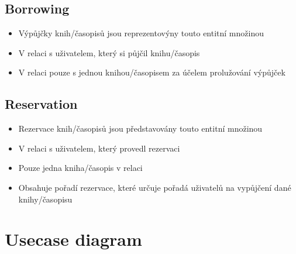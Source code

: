 \documentclass{article}
\begin{document}
\subsection*{Borrowing}
\begin{itemize}
    \item Výpůjčky knih/časopisů jsou reprezentovýny touto entitní množinou
    \item V relaci s uživatelem, který si půjčil knihu/časopis
    \item V relaci pouze s jednou knihou/časopisem za účelem prolužování
    výpůjček
\end{itemize}

\subsection*{Reservation}
\begin{itemize}
    \item Rezervace knih/časopisů jsou představovány touto entitní množinou
    \item V relaci s uživatelem, který provedl rezervaci
    \item Pouze jedna kniha/časopis v relaci
    \item Obsahuje pořadí rezervace, které určuje pořadá uživatelů na vypůjčení
    dané knihy/časopisu
\end{itemize}

\newpage

\section*{Usecase diagram}
\end{document}
